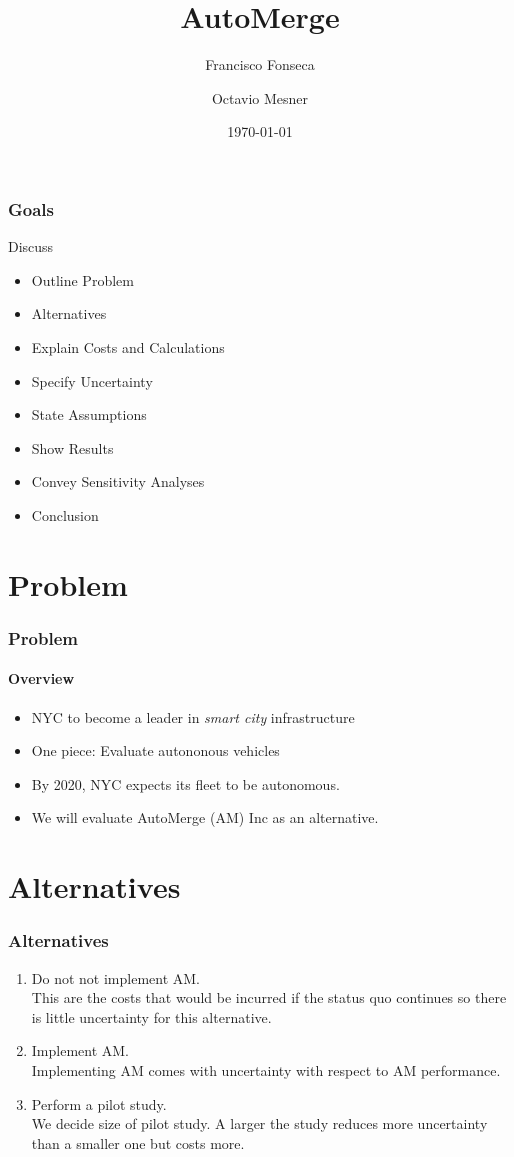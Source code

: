 \documentclass{beamer}
\title{AutoMerge}
\subtitle{}
\date{\today}
\author[Fonseca Mesner]{Francisco Fonseca \and Octavio Mesner}
\institute{Carnegie Mellon University}
\begin{document}
\maketitle

\section{}
\begin{frame}
\frametitle{Goals}
Discuss
\begin{itemize}
\item Outline Problem
\item Alternatives
\item Explain Costs and Calculations
\item Specify Uncertainty
\item State Assumptions
\item Show Results
\item Convey Sensitivity Analyses
\item Conclusion
\end{itemize}
\end{frame}

\section{Problem}

\begin{frame}
  \frametitle{Problem}
  \framesubtitle{Overview}
  \begin{itemize}
  \item NYC to become a leader in \emph{smart city} infrastructure
  \item One piece: Evaluate autononous vehicles
  \item By 2020, NYC expects its fleet to be autonomous.
  \item We will evaluate AutoMerge (AM) Inc as an alternative.
  \end{itemize}
\end{frame}

\section{Alternatives}
\begin{frame}
  \frametitle{Alternatives}
  \begin{enumerate}
  \item Do not not implement AM.\\
    This are the costs that would be incurred if the status quo
    continues so there is little uncertainty for this alternative.
  \item Implement AM.\\
    Implementing AM comes with uncertainty with respect to AM
    performance.
  \item Perform a pilot study.\\
    We decide size of pilot study.  A larger the study reduces more
    uncertainty than a smaller one but costs more.
  \end{enumerate}
\end{frame}
\end{document}
